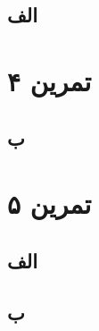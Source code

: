 \documentclass[]{article}
\begin{document}
\subsection*{\color{blue}{جواب}}
\subsection*{الف}

% 

\pagebreak
\section*{تمرین ۴}

\subsection*{\color{blue}{جواب}}

\subsection*{ب}


\pagebreak
\section*{تمرین ۵}

\subsection*{\color{blue}{جواب}}
\subsection*{الف}

\subsection*{ب}

\end{document}
